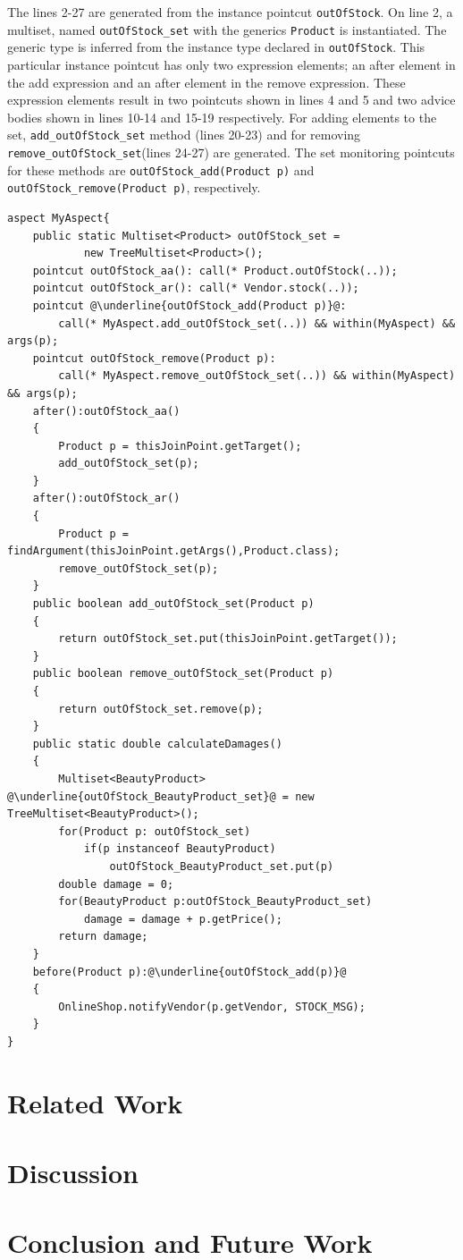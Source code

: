 \documentclass{llncs}
\begin{document}
The lines 2-27 are generated from the instance pointcut \texttt{outOfStock}. On line 2, a multiset, named \texttt{outOfStock_set} with the generics \texttt{Product} is instantiated. The generic type is inferred from the instance type declared in \texttt{outOfStock}. This particular instance pointcut has only two expression elements; an after element in the add expression and an after element in the remove expression. These expression elements result in two pointcuts shown in lines 4 and 5 and two advice bodies shown in lines 10-14 and 15-19 respectively. For adding elements to the set, \texttt{add_outOfStock_set} method (lines 20-23) and for removing \texttt{remove_outOfStock_set}(lines 24-27) are generated. The set monitoring pointcuts for these methods are \texttt{outOfStock_add(Product p)} and \texttt{outOfStock_remove(Product p)}, respectively.



\begin{lstlisting}[float=h!, caption={The generated AspectJ code from \texttt{outOfStock} instance pointcut}, label={lst:generated}, escapechar=@]
aspect MyAspect{
	public static Multiset<Product> outOfStock_set =
			new TreeMultiset<Product>();
	pointcut outOfStock_aa(): call(* Product.outOfStock(..));
	pointcut outOfStock_ar(): call(* Vendor.stock(..));
	pointcut @\underline{outOfStock_add(Product p)}@: 
		call(* MyAspect.add_outOfStock_set(..)) && within(MyAspect) && args(p);
	pointcut outOfStock_remove(Product p): 
		call(* MyAspect.remove_outOfStock_set(..)) && within(MyAspect) && args(p);
	after():outOfStock_aa()
	{
		Product p = thisJoinPoint.getTarget();
		add_outOfStock_set(p);
	}
	after():outOfStock_ar()
	{
		Product p = findArgument(thisJoinPoint.getArgs(),Product.class);
		remove_outOfStock_set(p);
	}
	public boolean add_outOfStock_set(Product p)
	{
		return outOfStock_set.put(thisJoinPoint.getTarget());
	}
	public boolean remove_outOfStock_set(Product p)
	{
		return outOfStock_set.remove(p);
	}
	public static double calculateDamages()
	{
		Multiset<BeautyProduct> @\underline{outOfStock_BeautyProduct_set}@ = new TreeMultiset<BeautyProduct>();
		for(Product p: outOfStock_set)
			if(p instanceof BeautyProduct)
				outOfStock_BeautyProduct_set.put(p)
		double damage = 0;
		for(BeautyProduct p:outOfStock_BeautyProduct_set)
			damage = damage + p.getPrice();
		return damage;
	}
	before(Product p):@\underline{outOfStock_add(p)}@
	{
		OnlineShop.notifyVendor(p.getVendor, STOCK_MSG);
	}
}
\end{lstlisting}


\section{Related Work}
\section{Discussion}
\section{Conclusion and Future Work}
\end{document}
